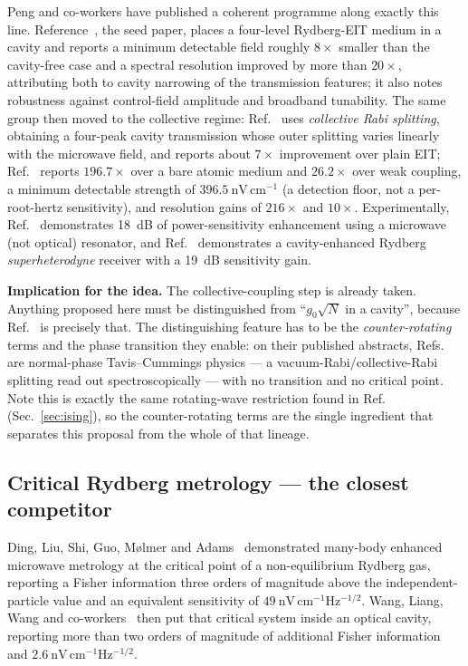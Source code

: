 \documentclass[11pt,a4paper]{article}
\begin{document}
Peng and co-workers have published a coherent programme along exactly this line.
Reference~\cite{Peng2018}, the seed paper, places a four-level Rydberg-EIT medium in a cavity
and reports a minimum detectable field roughly $8\times$ smaller than the cavity-free case
and a spectral resolution improved by more than $20\times$, attributing both to cavity
narrowing of the transmission features; it also notes robustness against control-field
amplitude and broadband tunability. The same group then moved to the collective regime:
Ref.~\cite{Yang2020} uses \emph{collective Rabi splitting}, obtaining a four-peak cavity
transmission whose outer splitting varies linearly with the microwave field, and reports
about $7\times$ improvement over plain EIT; Ref.~\cite{Wang2023} reports $196.7\times$ over
a bare atomic medium and $26.2\times$ over weak coupling, a minimum detectable strength of
$396.5~\mathrm{nV\,cm^{-1}}$ (a detection floor, not a per-root-hertz sensitivity), and
resolution gains of $216\times$ and $10\times$. Experimentally, Ref.~\cite{Liu2025}
demonstrates 18~dB of power-sensitivity enhancement using a microwave (not optical)
resonator, and Ref.~\cite{CavitySuperhet2025} demonstrates a cavity-enhanced Rydberg
\emph{superheterodyne} receiver with a 19~dB sensitivity gain.

\textbf{Implication for the idea.} The collective-coupling step is already taken. Anything
proposed here must be distinguished from ``$g_0\sqrt N$ in a cavity'', because
Ref.~\cite{Yang2020} is precisely that. The distinguishing feature has to be the
\emph{counter-rotating} terms and the phase transition they enable: on their published
abstracts, Refs.~\cite{Yang2020,Wang2023} are normal-phase Tavis--Cummings physics --- a
vacuum-Rabi/collective-Rabi splitting read out spectroscopically --- with no transition and
no critical point. Note this is exactly the same rotating-wave restriction found in
Ref.~\cite{Zhang2013} (Sec.~\ref{sec:ising}), so the counter-rotating terms are the single
ingredient that separates this proposal from the whole of that lineage.

\subsection{Critical Rydberg metrology --- the closest competitor}

Ding, Liu, Shi, Guo, M\o{}lmer and Adams~\cite{Ding2022} demonstrated many-body enhanced
microwave metrology at the critical point of a non-equilibrium Rydberg gas, reporting a
Fisher information three orders of magnitude above the independent-particle value and an
equivalent sensitivity of $49~\mathrm{nV\,cm^{-1}Hz^{-1/2}}$. Wang, Liang, Wang and
co-workers~\cite{Wang2025} then put that critical system inside an optical cavity, reporting
more than two orders of magnitude of additional Fisher information and
$2.6~\mathrm{nV\,cm^{-1}Hz^{-1/2}}$.
\end{document}
